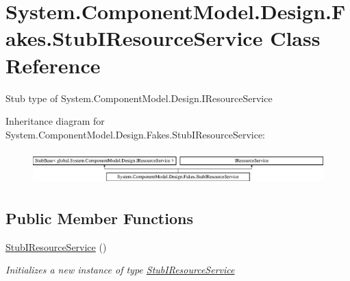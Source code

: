 \hypertarget{class_system_1_1_component_model_1_1_design_1_1_fakes_1_1_stub_i_resource_service}{\section{System.\-Component\-Model.\-Design.\-Fakes.\-Stub\-I\-Resource\-Service Class Reference}
\label{class_system_1_1_component_model_1_1_design_1_1_fakes_1_1_stub_i_resource_service}
}


Stub type of System.\-Component\-Model.\-Design.\-I\-Resource\-Service 


Inheritance diagram for System.\-Component\-Model.\-Design.\-Fakes.\-Stub\-I\-Resource\-Service\-:\begin{figure}[H]
\begin{center}
\leavevmode
\includegraphics[height=1.317647cm]{class_system_1_1_component_model_1_1_design_1_1_fakes_1_1_stub_i_resource_service}
\end{center}
\end{figure}
\subsection*{Public Member Functions}
\begin{DoxyCompactItemize}
\item 
\hyperlink{class_system_1_1_component_model_1_1_design_1_1_fakes_1_1_stub_i_resource_service_a458c264ad3fa4752c7f8eb0def20bba7}{Stub\-I\-Resource\-Service} ()
\begin{DoxyCompactList}\small\item\em Initializes a new instance of type \hyperlink{class_system_1_1_component_model_1_1_design_1_1_fakes_1_1_stub_i_resource_service}{Stub\-I\-Resource\-Service}\end{DoxyCompactList}\end{DoxyCompactItemize}
